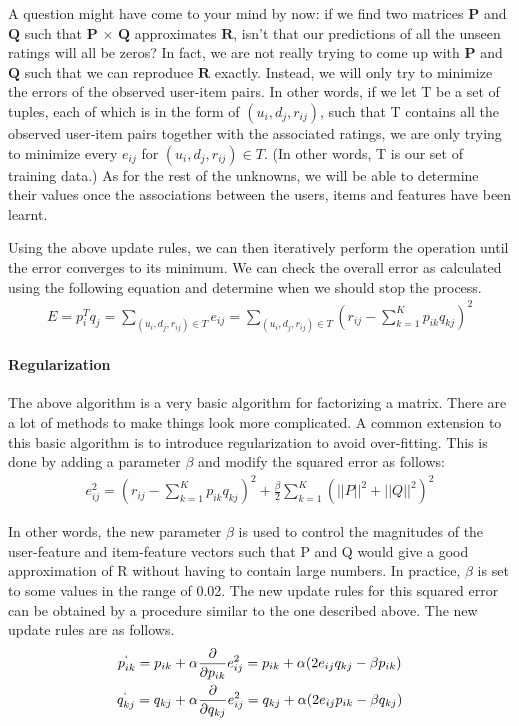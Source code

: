  A question might have come to your mind by now: if we find two matrices $\mathbf{P}$ and $\mathbf{Q}$ such that $\mathbf{P}$ $\times$ $\mathbf{Q}$ approximates $\mathbf{R}$, isn’t that our predictions of all the unseen ratings will all be zeros? In fact, we are not really trying to come up with $\mathbf{P}$ and $\mathbf{Q}$ such that we can reproduce $\mathbf{R}$ exactly. Instead, we will only try to minimize the errors of the observed user-item pairs. In other words, if we let T be a set of tuples, each of which is in the form of $(u_i, d_j, r_{ij})$, such that T contains all the observed user-item pairs together with the associated ratings, we are only trying to minimize every $e_{ij}$ for $(u_i, d_j, r_{ij}) \in T$. (In other words, T is our set of training data.) As for the rest of the unknowns, we will be able to determine their values once the associations between the users, items and features have been learnt.

 Using the above update rules, we can then iteratively perform the operation until the error converges to its minimum. We can check the overall error as calculated using the following equation and determine when we should stop the process.
  \begin{gather*}
    E = p_i^{T}q_j = \sum_{(u_i,d_j,r_{ij})\in T} e_{ij} = \sum_{(u_i,d_j,r_{ij})\in T} (r_{ij} - \sum_{k=1}^{K}p_{ik}q_{kj})^2
  \end{gather*}
\paragraph{Regularization}

 The above algorithm is a very basic algorithm for factorizing a matrix. There are a lot of methods to make things look more complicated. A common extension to this basic algorithm is to introduce regularization to avoid over-fitting. This is done by adding a parameter $\beta$ and modify the squared error as follows:
  \begin{gather*}
    e_{ij}^2 = (r_{ij} - \sum_{k=1}^{K}p_{ik}q_{kj})^2 + \frac{\beta}{2}\sum_{k=1}^{K}(||P||^2 + ||Q||^2)^2
  \end{gather*}

 In other words, the new parameter $\beta$ is used to control the magnitudes of the user-feature and item-feature vectors such that P and Q would give a good approximation of R without having to contain large numbers. In practice, $\beta$ is set to some values in the range of 0.02. The new update rules for this squared error can be obtained by a procedure similar to the one described above. The new update rules are as follows.
\begin{gather*}
      p^`_{ik} = p_{ik} + \alpha\frac{\partial}{\partial p_{ik}}e_{ij}^2 = p_{ik} + \alpha(2e_{ij}q_{kj} - \beta p_{ik}) \\
      q^`_{kj} = q_{kj} + \alpha\frac{\partial}{\partial q_{kj}}e_{ij}^2 = q_{kj} + \alpha(2e_{ij}p_{ik} - \beta q_{kj})
  \end{gather*}
